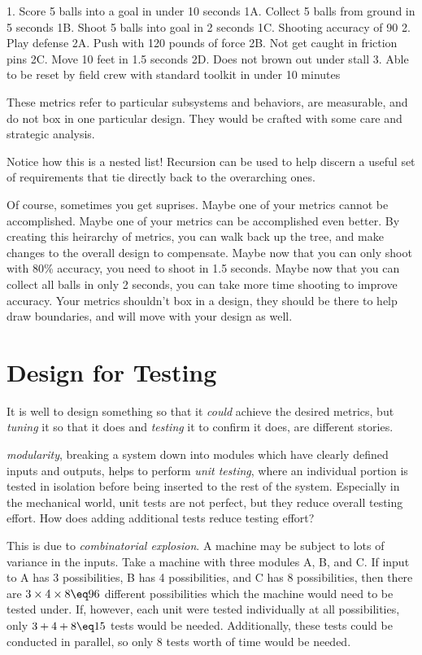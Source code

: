 1. Score 5 balls into a goal in under 10 seconds
1A. Collect 5 balls from ground in 5 seconds
1B. Shoot 5 balls into goal in 2 seconds
1C. Shooting accuracy of 90%
2. Play defense
2A. Push with 120 pounds of force
2B. Not get caught in friction pins
2C. Move 10 feet in 1.5 seconds
2D. Does not brown out under stall
3. Able to be reset by field crew with standard toolkit in under 10 minutes

These metrics refer to particular subsystems and behaviors, are measurable, and do not box in one particular design. They would be crafted with some care and strategic analysis.

Notice how this is a nested list! Recursion can be used to help discern a useful set of requirements that tie directly back to the overarching ones.

Of course, sometimes you get suprises. Maybe one of your metrics cannot be accomplished. Maybe one of your metrics can be accomplished even better. By creating this heirarchy of metrics, you can walk back up the tree, and make changes to the overall design to compensate. Maybe now that you can only shoot with 80\% accuracy, you need to shoot in 1.5 seconds. Maybe now that you can collect all balls in only 2 seconds, you can take more time shooting to improve accuracy. Your metrics shouldn't box in a design, they should be there to help draw boundaries, and will move with your design as well.

\section{Design for Testing}

It is well to design something so that it \textit{could} achieve the desired metrics, but \textit{tuning} it so that it does and \textit{testing} it to confirm it does, are different stories. 

\textit{modularity}, breaking a system down into modules which have clearly defined inputs and outputs, helps to perform \textit{unit testing}, where an individual portion is tested in isolation before being inserted to the rest of the system. Especially in the mechanical world, unit tests are not perfect, but they reduce overall testing effort. How does adding additional tests reduce testing effort?

This is due to \textit{combinatorial explosion}. A machine may be subject to lots of variance in the inputs. Take a machine with three modules A, B, and C. If input to A has 3 possibilities, B has 4 possibilities, and C has 8 possibilities, then there are $3 \times 4 \times 8 \eq 96$ different possibilities which the machine would need to be tested under. If, however, each unit were tested individually at all possibilities, only $3+4+8 \eq 15$ tests would be needed. Additionally, these tests could be conducted in parallel, so only 8 tests worth of time would be needed.

